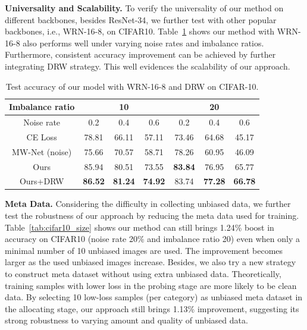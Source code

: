 \documentclass[letterpaper]{article} %
\newcommand{\bd}[1]{\textbf{#1}}
\begin{document}
\noindent
\bd{Universality and Scalability.}
To verify the universality of our method on different backbones, besides ResNet-34, we further test with other popular backbones, i.e., WRN-16-8, on CIFAR10.
Table~\ref{tab:cifar10_wrn} shows our method with WRN-16-8
also performs well under varying noise rates and imbalance ratios.
Furthermore, consistent accuracy improvement can be achieved by further integrating DRW strategy.
This well evidences the scalability of our approach.
\begin{table}[h]
\begin{center}
\begin{adjustbox}{max width=0.47\textwidth}
    \begin{tabular}{c|c|c|c|c|c|c}
    \hline
    Imbalance ratio & \multicolumn{3}{c|}{10}    & \multicolumn{3}{c}{20} \\
    \hline
    Noise rate  & 0.2   & 0.4 & 0.6  & 0.2   & 0.4 & 0.6 \\
    \hline
    CE Loss & 78.81 & 66.11 & 57.11 & 73.46 & 64.68 & 45.17 \\
    \hline
    MW-Net (noise) & 75.66 & 70.57 & 58.71 &   78.26    & 60.95 & 46.09 \\
    \hline
    Ours  & 85.94 & 80.51 & 73.55 & \bd{83.84} & 76.95 & 65.77 \\
    \hline
    Ours+DRW & \bd{86.52} & \bd{81.24} & \bd{74.92} & 83.74 & \bd{77.28} & \bd{66.78} \\
    \hline
    \end{tabular}%
\end{adjustbox}
\caption{
Test accuracy of our model with  WRN-16-8 and DRW on CIFAR-10.
}
\label{tab:cifar10_wrn}
\end{center}
\end{table}

\noindent\bd{Meta Data.}
Considering the difficulty in collecting unbiased data, we further test the robustness of our approach by reducing the meta data used for training.
Table~\ref{tab:cifar10_size} shows our method can still brings 1.24\% boost in accuracy on CIFAR10 (noise rate 20\% and imbalance ratio 20) even when only a  minimal number of 10 unbiased images are used. The improvement becomes larger as the used unbiased images increase.
Besides, we also try a new strategy to construct meta dataset without using extra unbiased data.
Theoretically, training samples with lower loss in the probing stage are more likely to be clean data.
By selecting 10 low-loss samples (per category) as unbiased meta dataset in the allocating stage,
our approach still brings 1.13\% improvement,
suggesting its strong robustness to varying amount and quality of unbiased data.
\end{document}
